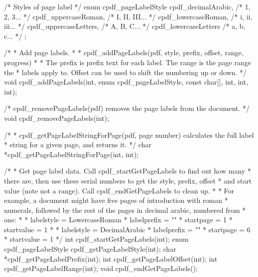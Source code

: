 /* Styles of page label */
enum cpdf_pageLabelStyle {
  cpdf_decimalArabic,    /* 1, 2, 3... */
  cpdf_uppercaseRoman,   /* I, II, III... */
  cpdf_lowercaseRoman,   /* i, ii, iii... */
  cpdf_uppercaseLetters, /* A, B, C... */
  cpdf_lowercaseLetters  /* a, b, c... */
};

/*
 * Add page labels.
 *
 * cpdf_addPageLabels(pdf, style, prefix, offset, range, progress)
 *
 * The prefix is prefix text for each label. The range is the page range the
 * labels apply to. Offset can be used to shift the numbering up or down.
 */
void cpdf_addPageLabels(int, enum cpdf_pageLabelStyle, const char[], int, int,
                        int);

/* cpdf_removePageLabels(pdf) removes the page labels from the document. */
void cpdf_removePageLabels(int);

/*
 * cpdf_getPageLabelStringForPage(pdf, page number) calculates the full label
 * string for a given page, and returns it.
 */
char *cpdf_getPageLabelStringForPage(int, int);

/*
 * Get page label data. Call cpdf_startGetPageLabels to find out how many
 * there are, then use these serial numbers to get the style, prefix, offset
 * and start value (note not a range). Call cpdf_endGetPageLabels to clean up.
 *
 * For example, a document might have five pages of introduction with roman
 * numerals, followed by the rest of the pages in decimal arabic, numbered from
 * one:
 *
 * labelstyle = LowercaseRoman
 * labelprefix = ""
 * startpage = 1
 * startvalue = 1
 *
 * labelstyle = DecimalArabic
 * labelprefix = ""
 * startpage = 6
 * startvalue = 1
 */
int cpdf_startGetPageLabels(int);
enum cpdf_pageLabelStyle cpdf_getPageLabelStyle(int);
char *cpdf_getPageLabelPrefix(int);
int cpdf_getPageLabelOffset(int);
int cpdf_getPageLabelRange(int);
void cpdf_endGetPageLabels();

